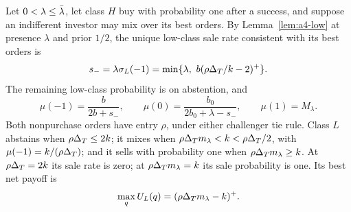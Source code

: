 \begin{lemma}\label{lem:a5-sale}
Let \(0<\lambda\le\bar\lambda\), let class \(H\) buy with probability one after a success, and suppose an indifferent investor
may mix over its best orders. By Lemma~\ref{lem:a4-low} at presence \(\lambda\) and prior \(1/2\),
the unique low-class sale rate consistent with its best orders is
\begin{equation}\label{eq:a5-sale}
 s_-=\lambda\sigma_L(-1)=\min\{\lambda,\ b(\rho\Delta_T/k-2)^+\}.
\end{equation}
The remaining low-class probability is on abstention, and
\[
 \mu(-1)=\frac{b}{2b+s_-},\qquad
 \mu(0)=\frac{b_0}{2b_0+\lambda-s_-},\qquad \mu(1)=M_\lambda.
\]
Both nonpurchase orders have entry \(\rho\), under either challenger tie rule. Class \(L\) abstains when
\(\rho\Delta_T\le2k\); it mixes when \(\rho\Delta_T m_\lambda<k<\rho\Delta_T/2\), with
\(\mu(-1)=k/(\rho\Delta_T)\); and it sells with probability one when \(\rho\Delta_T m_\lambda\ge k\).
At \(\rho\Delta_T=2k\) its sale rate is zero; at \(\rho\Delta_T m_\lambda=k\) its sale probability is one.
Its best net payoff is
\[
 \max_q U_L(q)=(\rho\Delta_T m_\lambda-k)^+.
\]
\end{lemma}


